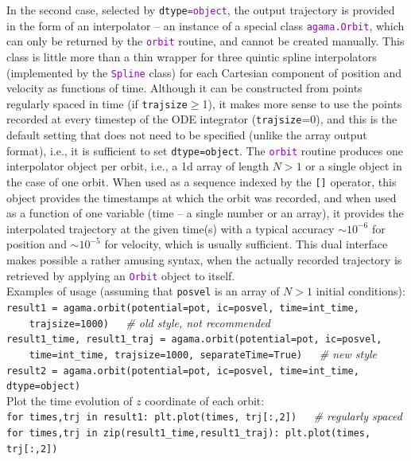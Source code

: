 \documentclass[12pt]{article}
\newcommand{\ttt}[1]{\textcolor{darkviolet}{\texttt{#1}}}
\newcommand{\ppp}[1]{\textcolor{darkolive} {\texttt{#1}}}
\begin{document}
In the second case, selected by \ppp{dtype}\ttt{=object}, the output trajectory is provided in the form of an interpolator -- an instance of a special class \ttt{agama.Orbit}, which can only be returned by the \ttt{orbit} routine, and cannot be created manually. This class is little more than a thin wrapper for three quintic spline interpolators (implemented by the \ttt{Spline} class) for each Cartesian component of position and velocity as functions of time. Although it can be constructed from points regularly spaced in time (if \ppp{trajsize}$\ge$1), it makes more sense to use the points recorded at every timestep of the ODE integrator (\ppp{trajsize}=0), and this is the default setting that does not need to be specified (unlike the array output format), i.e., it is sufficient to set \ppp{dtype}\texttt{=object}. The \ttt{orbit} routine produces one interpolator object per orbit, i.e., a 1d array of length $N>1$ or a single object in the case of one orbit. When used as a sequence indexed by the \texttt{[]} operator, this object provides the timestamps at which the orbit was recorded, and when used as a function of one variable (time -- a single number or an array), it provides the interpolated trajectory at the given time(s) with a typical accuracy $\sim10^{-6}$ for position and $\sim10^{-5}$ for velocity, which is usually sufficient. This dual interface makes possible a rather amusing syntax, when the actually recorded trajectory is retrieved by applying an \ttt{Orbit} object to itself.\\[1mm]
Examples of usage (assuming that \texttt{posvel} is an array of $N>1$ initial conditions):\\[1mm]
\texttt{result1 = agama.orbit(potential=pot, ic=posvel, time=int_time,\\
\mbox{}~~~~trajsize=1000)\ \ \ }\textit{\color{Sepia}\# old style, not recommended}\\
\texttt{result1_time, result1_traj = agama.orbit(potential=pot, ic=posvel, \\
\mbox{}~~~~time=int_time, trajsize=1000, separateTime=True)\ \ \ }\textit{\color{Sepia}\# new style}\\
\texttt{result2 = agama.orbit(potential=pot, ic=posvel, time=int_time, dtype=object)}\\[1mm]
Plot the time evolution of $z$ coordinate of each orbit:\\[1mm]
\texttt{for times,trj in result1: plt.plot(times, trj[:,2])\ \ \ }\textit{\color{Sepia}\# regularly spaced} \\
\texttt{for times,trj in zip(result1_time,result1_traj): plt.plot(times, trj[:,2])}\\
\end{document}
